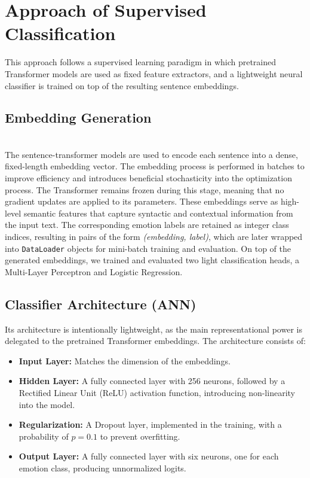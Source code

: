 \documentclass[runningheads]{llncs}
\begin{document}
\section{Approach of Supervised Classification}

This approach follows a supervised learning paradigm in which pretrained Transformer models are used as fixed feature extractors, and a lightweight neural classifier is trained on top of the resulting sentence embeddings.
\subsection{Embedding Generation} \label{sec:embedding}

\noindent
\\
The sentence-transformer models are used to encode each sentence into a dense, fixed-length embedding vector. The embedding process is performed in batches to improve efficiency and introduces beneficial stochasticity into the optimization process. The Transformer remains frozen during this stage, meaning that no gradient updates are applied to its parameters.
These embeddings serve as high-level semantic features that capture syntactic and contextual information from the input text. The corresponding emotion labels are retained as integer class indices, resulting in pairs of the form \textit{(embedding, label)}, which are later wrapped into \texttt{DataLoader} objects for mini-batch training and evaluation. On top of the generated embeddings, we trained and evaluated two light classification heads, a Multi-Layer Perceptron and Logistic Regression. 

\vspace{-1em}
\subsection{Classifier Architecture (ANN)}

\noindent
Its architecture is intentionally lightweight, as the main representational power is delegated to the pretrained Transformer embeddings. The architecture consists of:
\begin{itemize}
    \item \textbf{Input Layer:} Matches the dimension of the embeddings.
    \item \textbf{Hidden Layer:} A fully connected layer with 256 neurons, followed by a Rectified Linear Unit (ReLU) activation function, introducing non-linearity into the model.
    \item \textbf{Regularization:} A Dropout layer, implemented in the training, with a probability of $p=0.1$ to prevent overfitting.
    \item \textbf{Output Layer:} A fully connected layer with six neurons, one for each emotion class, producing unnormalized logits.
\end{itemize}
\end{document}
